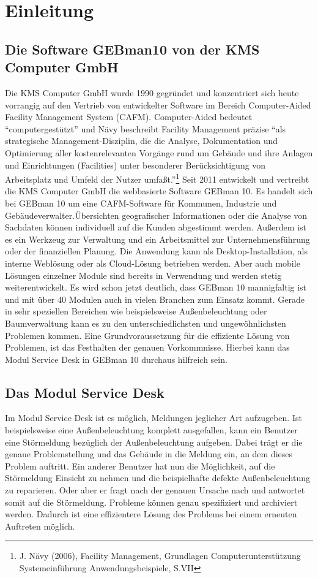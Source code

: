 \section{Einleitung}

\subsection{Die Software GEBman10 von der KMS Computer GmbH}
\noindent
Die KMS Computer GmbH wurde 1990 gegründet und konzentriert sich heute vorrangig auf den Vertrieb von entwickelter Software im Bereich Computer-Aided Facility Management System (CAFM).
Computer-Aided bedeutet \enquote{computergestützt} und Nävy beschreibt Facility Management präzise
\enquote{als strategische Management-Disziplin, die die Analyse, Dokumentation und Optimierung aller kostenrelevanten Vorgänge rund um Gebäude und ihre Anlagen und Einrichtungen (Facilities) unter besonderer Berücksichtigung von Arbeitsplatz und Umfeld der Nutzer umfaßt.}\footnote{J. Nävy (2006), Facility Management, Grundlagen Computerunterstützung Systemeinführung Anwendungsbeispiele, S.VII}
\noindent
Seit 2011 entwickelt und vertreibt die KMS Computer GmbH die webbasierte Software GEBman 10. Es handelt sich bei GEBman 10 um eine CAFM-Software für Kommunen, Industrie und Gebäudeverwalter.Übersichten geografischer Informationen oder die Analyse von Sachdaten können individuell auf die Kunden abgestimmt werden. Außerdem ist es ein Werkzeug zur Verwaltung und ein Arbeitsmittel zur Unternehmensführung oder der finanziellen Planung. Die Anwendung kann als Desktop-Installation, als interne Weblösung oder als Cloud-Lösung betrieben werden. Aber auch mobile Lösungen einzelner Module sind bereits in Verwendung und werden stetig weiterentwickelt. Es wird schon jetzt deutlich, dass GEBman 10 mannigfaltig ist und mit über 40 Modulen auch in vielen Branchen zum Einsatz kommt.
Gerade in sehr speziellen Bereichen wie beispielsweise Außenbeleuchtung oder Baumverwaltung kann es zu den unterschiedlichsten und ungewöhnlichsten Problemen kommen. Eine Grundvoraussetzung  für die effiziente Lösung von Problemen, ist das Festhalten der genauen Vorkommnisse. Hierbei kann das Modul Service Desk in GEBman 10 durchaus hilfreich sein.



\subsection{Das Modul Service Desk}
\noindent
Im Modul Service Desk ist es möglich, Meldungen jeglicher Art aufzugeben. Ist beispielsweise eine Außenbeleuchtung komplett ausgefallen, kann ein Benutzer eine Störmeldung bezüglich der Außenbeleuchtung aufgeben. Dabei trägt er die genaue Problemstellung und das Gebäude in die Meldung ein, an dem dieses Problem auftritt. Ein anderer Benutzer hat nun die Möglichkeit, auf die Störmeldung Einsicht zu nehmen und die beispielhafte defekte Außenbeleuchtung zu reparieren. Oder aber er fragt nach der genauen Ursache nach und antwortet somit auf die Störmeldung. Probleme können genau spezifiziert und archiviert werden. Dadurch ist eine effizientere Lösung des Problems bei einem erneuten Auftreten möglich.

